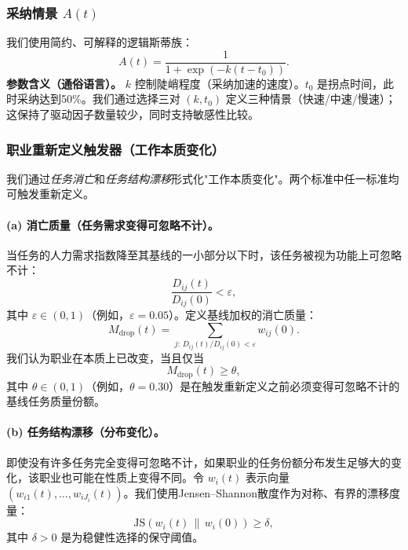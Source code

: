 \subsubsection{采纳情景 $A(t)$}
\label{sec:adoption}
我们使用简约、可解释的逻辑斯蒂族：
\begin{equation}
\label{eq:adoption_logistic}
A(t) = \frac{1}{1+\exp\!\left(-k(t-t_0)\right)}.
\end{equation}
\noindent\textbf{参数含义（通俗语言）。} $k$ 控制陡峭程度（采纳加速的速度）。$t_0$ 是拐点时间，此时采纳达到50\%。我们通过选择三对 $(k,t_0)$ 定义三种情景（快速/中速/慢速）；这保持了驱动因子数量较少，同时支持敏感性比较。

\subsubsection{职业重新定义触发器（工作本质变化）}
\label{sec:redefinition}
我们通过\emph{任务消亡}和\emph{任务结构漂移}形式化"工作本质变化"。两个标准中任一标准均可触发重新定义。

\paragraph{(a) 消亡质量（任务需求变得可忽略不计）。}
当任务的人力需求指数降至其基线的一小部分以下时，该任务被视为功能上可忽略不计：
\begin{equation}
\label{eq:extinction_rule}
\frac{D_{ij}(t)}{D_{ij}(0)}<\varepsilon,
\end{equation}
其中 $\varepsilon\in(0,1)$（例如，$\varepsilon=0.05$）。定义基线加权的消亡质量：
\begin{equation}
\label{eq:Mdrop}
M_{\text{drop}}(t)=\sum_{j:\,D_{ij}(t)/D_{ij}(0)<\varepsilon} w_{ij}(0).
\end{equation}
我们认为职业在本质上已改变，当且仅当
\begin{equation}
\label{eq:Mdrop_trigger}
M_{\text{drop}}(t)\ge \theta,
\end{equation}
其中 $\theta\in(0,1)$（例如，$\theta=0.30$）是在触发重新定义之前必须变得可忽略不计的基线任务质量份额。

\paragraph{(b) 任务结构漂移（分布变化）。}
即使没有许多任务完全变得可忽略不计，如果职业的任务份额分布发生足够大的变化，该职业也可能在性质上变得不同。令 $w_i(t)$ 表示向量 $(w_{i1}(t),\dots,w_{iJ_i}(t))$。我们使用Jensen--Shannon散度作为对称、有界的漂移度量：
\begin{equation}
\label{eq:JS_trigger}
\mathrm{JS}\!\left(w_i(t)\,\|\,w_i(0)\right) \ge \delta,
\end{equation}
其中 $\delta>0$ 是为稳健性选择的保守阈值。

